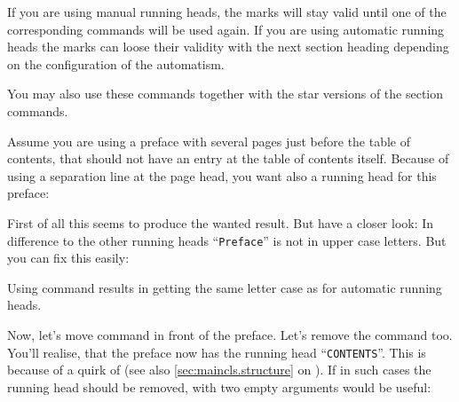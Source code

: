 If you are using manual running heads, the marks will stay valid until one of
the corresponding commands will be used again. If you are using automatic
running heads the marks can loose their validity with the next section heading
depending on the configuration of the automatism.

You may also use these commands together with the star versions of the section
commands.%
\ifCommonscrlayerscrpage %
\begin{Example}
  Assume you are using a preface with several pages just before the table of
  contents, that should not have an entry at the table of contents
  itself. Because of using a separation line at the page head, you want also a
  running head for this preface:
  First of all this seems to produce the wanted result. But have a closer
  look: In difference to the other running heads ``\texttt{Preface}'' is not in
  upper case letters. But you can fix this easily:
  Using command  results in getting the same letter case
  as for automatic running heads.

  Now, let's move command  in front of the
  preface. Let's remove the  command too. You'll realise, that
  the preface now has the running head ``\texttt{CONTENTS}''. This is because
  of a quirk of  (see also \autoref{sec:maincls.structure} on
  ). If in such cases the running head
  should be removed,  with two empty arguments would be
  useful:
\end{Example}

